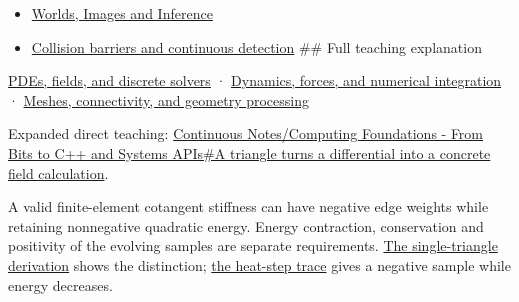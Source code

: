 \begin{itemize}
\item
  \href{Continuous\%20Notes/University\%20-\%20Worlds,\%20Images\%20and\%20Inference\%20-\%20Graphics,\%20Vision\%20and\%20Photography}{Worlds, Images and Inference}
\item
  \hyperref[appendix-a9ba01fa72a6]{Collision barriers and continuous detection} \#\# Full teaching explanation
\end{itemize}

\href{Continuous\%20Notes/University\%20-\%20Worlds,\%20Images\%20and\%20Inference\%20-\%20Graphics,\%20Vision\%20and\%20Photography\#PDEs,\%20fields,\%20and\%20discrete\%20solvers}{PDEs, fields, and discrete solvers} · \href{Continuous\%20Notes/University\%20-\%20Worlds,\%20Images\%20and\%20Inference\%20-\%20Graphics,\%20Vision\%20and\%20Photography\#Dynamics,\%20forces,\%20and\%20numerical\%20integration}{Dynamics, forces, and numerical integration} · \href{Continuous\%20Notes/University\%20-\%20Worlds,\%20Images\%20and\%20Inference\%20-\%20Graphics,\%20Vision\%20and\%20Photography\#Meshes,\%20connectivity,\%20and\%20geometry\%20processing}{Meshes, connectivity, and geometry processing}

Expanded direct teaching: \href{Continuous\%20Notes/Computing\%20Foundations\%20-\%20From\%20Bits\%20to\%20C++\%20and\%20Systems\%20APIs\#A\%20triangle\%20turns\%20a\%20differential\%20into\%20a\%20concrete\%20field\%20calculation}{Continuous Notes/Computing Foundations - From Bits to C++ and Systems APIs\#A triangle turns a differential into a concrete field calculation}.

A valid finite-element cotangent stiffness can have negative edge weights while retaining nonnegative quadratic energy. Energy contraction, conservation and positivity of the evolving samples are separate requirements. \href{Continuous\%20Notes/University\%20-\%20Worlds,\%20Images\%20and\%20Inference\%20-\%20Graphics,\%20Vision\%20and\%20Photography\#Nonnegative\%20energy\%20and\%20nonnegative\%20weights\%20are\%20different\%20promises}{The single-triangle derivation} shows the distinction; \href{Continuous\%20Notes/University\%20-\%20Worlds,\%20Images\%20and\%20Inference\%20-\%20Graphics,\%20Vision\%20and\%20Photography\#A\%20stable\%20heat\%20step\%20can\%20still\%20create\%20a\%20negative\%20sample}{the heat-step trace} gives a negative sample while energy decreases.
